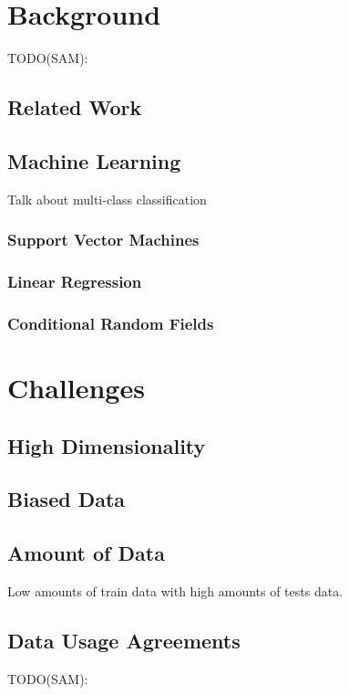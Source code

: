 \documentclass[preprint]{style}
\begin{document}
\section{Background}
TODO(SAM):
\subsection{Related Work}

\subsection{Machine Learning}

Talk about multi-class classification

\subsubsection{Support Vector Machines}

\subsubsection{Linear Regression}

\subsubsection{Conditional Random Fields}

\section{Challenges}

\subsection{High Dimensionality}

\subsection{Biased Data}

\subsection{Amount of Data}

Low amounts of train data with high amounts of tests data.

\subsection{Data Usage Agreements}
TODO(SAM):
\end{document}
